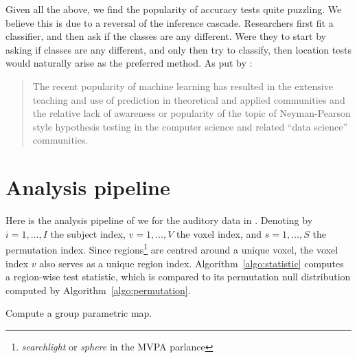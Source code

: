 \documentclass[12pt,a4paper]{article}
\begin{document}
Given all the above, we find the popularity of accuracy tests quite puzzling. 
We believe this is due to a reversal of the inference cascade. 
Researchers first fit a classifier, and then ask if the classes are any different.
Were they to start by asking if classes are any different, and only then try to classify, then location tests would naturally arise as the preferred method. 
As put by \cite{ramdas_classification_2016}:
\begin{quote}
The recent popularity of machine learning has resulted in the extensive teaching and use
of prediction in theoretical and applied communities and the relative lack of awareness or
popularity of the topic of Neyman-Pearson style hypothesis testing in the computer science
and related ``data science'' communities.
\end{quote}





















\appendix


\newpage

\section{Analysis pipeline}
\label{apx:analysis}

Here is the analysis pipeline of \cite{stelzer_statistical_2013} we for the auditory data in \cite{gilron_quantifying_2016}.
Denoting by 
$i=1,\dots,I$ the subject index, 
$v=1,\dots,V$ the voxel index, and 
$s = 1,\dots,S$ the permutation index. 
Since regions\footnote{\emph{searchlight} or \emph{sphere} in the MVPA parlance} are centred around a unique voxel, the voxel index $v$ also serves as a unique region index.
Algorithm~\ref{algo:statistic} computes a region-wise test statistic, which is compared to its permutation null distribution computed by Algorithm~\ref{algo:permutation}.


\begin{algorithm}[H]
\caption{Compute a group parametric map.}
\label{algo:statistic}

\end{algorithm}
\end{document}

